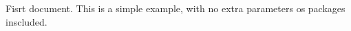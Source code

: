 \documentclass{article}
\begin{document}
    Fisrt document. This is a simple example, with no extra parameters os packages inscluded.
\end{document}
